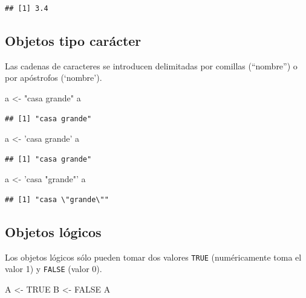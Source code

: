 \documentclass[]{book}
\newenvironment{Shaded}{\begin{snugshade}}{\end{snugshade}}
\newcommand{\NormalTok}[1]{#1}
\newcommand{\OtherTok}[1]{\textcolor[rgb]{0.56,0.35,0.01}{#1}}
\newcommand{\StringTok}[1]{\textcolor[rgb]{0.31,0.60,0.02}{#1}}
\begin{document}
\begin{verbatim}
## [1] 3.4
\end{verbatim}

\hypertarget{objetos-tipo-caracter}{%
\subsection{Objetos tipo carácter}\label{objetos-tipo-caracter}}

Las cadenas de caracteres
se introducen delimitadas por comillas (``nombre'') o por apóstrofos
(`nombre').

\begin{Shaded}
\begin{Highlighting}[]
\NormalTok{a <-}\StringTok{ "casa grande"}
\NormalTok{a}
\end{Highlighting}
\end{Shaded}

\begin{verbatim}
## [1] "casa grande"
\end{verbatim}

\begin{Shaded}
\begin{Highlighting}[]
\NormalTok{a <-}\StringTok{ 'casa grande'}
\NormalTok{a}
\end{Highlighting}
\end{Shaded}

\begin{verbatim}
## [1] "casa grande"
\end{verbatim}

\begin{Shaded}
\begin{Highlighting}[]
\NormalTok{a <-}\StringTok{ 'casa "grande"'}
\NormalTok{a}
\end{Highlighting}
\end{Shaded}

\begin{verbatim}
## [1] "casa \"grande\""
\end{verbatim}

\hypertarget{objetos-logicos}{%
\subsection{Objetos lógicos}\label{objetos-logicos}}

Los objetos lógicos sólo pueden
tomar dos valores \texttt{TRUE} (numéricamente toma el valor 1) y \texttt{FALSE}
(valor 0).

\begin{Shaded}
\begin{Highlighting}[]
\NormalTok{A <-}\StringTok{ }\OtherTok{TRUE}
\NormalTok{B <-}\StringTok{ }\OtherTok{FALSE}
\NormalTok{A}
\end{Highlighting}
\end{Shaded}
\end{document}
